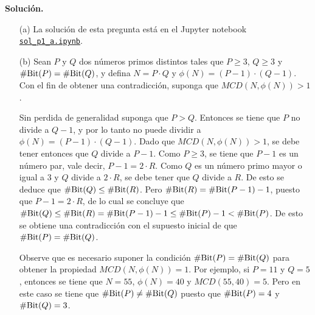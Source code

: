 \documentclass[11pt]{article}
\newcommand{\MCD}{\textit{MCD}}
\begin{document}
\noindent
{\bf Solución.}
\begin{enumerate}
\item[(a)] La solución de esta pregunta está en el Jupyter notebook
  \href{https://github.com/IIC3253/2023/blob/main/tareas/tarea\%202/soluciones/p1/sol_p1_a.ipynb}{\texttt{sol\_p1\_a.ipynb}}.

\item[(b)] Sean $P$ y $Q$ dos números primos distintos tales que $P
  \geq 3$, $Q \geq 3$ y $\#\text{Bit}(P) = \#\text{Bit}(Q)$, y defina $N = P \cdot Q$
  y $\phi(N) = (P-1) \cdot (Q-1)$. Con el fin de obtener una
  contradicción, suponga que $\MCD(N, \phi(N)) > 1$.

  Sin perdida de generalidad suponga que $P > Q$. Entonces se tiene
  que $P$ no divide a $Q-1$, y por lo tanto no puede dividir a
  $\phi(N) = (P-1) \cdot (Q-1)$. Dado que $\MCD(N, \phi(N)) > 1$, se
  debe tener entonces que $Q$ divide a $P-1$. Como $P \geq 3$, se
  tiene que $P-1$ es un número par, vale decir, $P-1 = 2 \cdot
  R$. Como $Q$ es un número primo mayor o igual a $3$ y $Q$ divide a
  $2 \cdot R$, se debe tener que $Q$ divide a $R$. De esto se deduce
  que $\#\text{Bit}(Q) \leq \#\text{Bit}(R)$. Pero $\#\text{Bit}(R) = \#\text{Bit}(P-1) - 1$,
  puesto que $P-1 = 2 \cdot R$, de lo cual se concluye que $\#\text{Bit}(Q)
  \leq \#\text{Bit}(R) = \#\text{Bit}(P-1) - 1 \leq \#\text{Bit}(P) - 1 < \#\text{Bit}(P)$. De
  esto se obtiene una contradicción con el supuesto inicial de que
  $\#\text{Bit}(P) = \#\text{Bit}(Q)$.

  Observe que es necesario suponer la condición $\#\text{Bit}(P) = \#\text{Bit}(Q)$ para
  obtener la propiedad $\MCD(N, \phi(N)) = 1$. Por ejemplo, si $P = 11$ y $Q =
  5$, entonces se tiene que $N = 55$, $\phi(N) = 40$ y $\MCD(55, 40) =
  5$. Pero en este caso se tiene que $\#\text{Bit}(P) \neq \#\text{Bit}(Q)$ puesto que
  $\#\text{Bit}(P) = 4$ y $\#\text{Bit}(Q) = 3$.


\end{enumerate}
\end{document}
